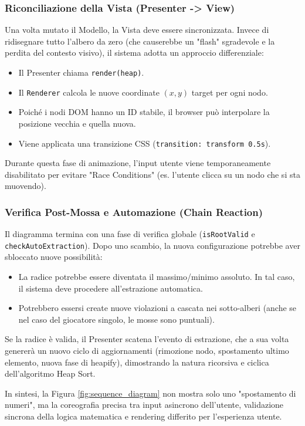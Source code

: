 \documentclass[openany]{theme/uniprthesis}
\begin{document}
\subsubsection{Riconciliazione della Vista (Presenter -> View)}
Una volta mutato il Modello, la Vista deve essere sincronizzata.
Invece di ridisegnare tutto l'albero da zero (che causerebbe un "flash" sgradevole e la perdita del contesto visivo), il sistema adotta un approccio differenziale:
\begin{itemize}
    \item Il Presenter chiama \texttt{render(heap)}.
    \item Il \texttt{Renderer} calcola le nuove coordinate $(x, y)$ target per ogni nodo.
    \item Poiché i nodi DOM hanno un ID stabile, il browser può interpolare la posizione vecchia e quella nuova.
    \item Viene applicata una transizione CSS (\texttt{transition: transform 0.5s}).
\end{itemize}
Durante questa fase di animazione, l'input utente viene temporaneamente disabilitato per evitare "Race Conditions" (es. l'utente clicca su un nodo che si sta muovendo).

\subsubsection{Verifica Post-Mossa e Automazione (Chain Reaction)}
Il diagramma termina con una fase di verifica globale (\texttt{isRootValid} e \texttt{checkAutoExtraction}).
Dopo uno scambio, la nuova configurazione potrebbe aver sbloccato nuove possibilità:
\begin{itemize}
    \item La radice potrebbe essere diventata il massimo/minimo assoluto. In tal caso, il sistema deve procedere all'estrazione automatica.
    \item Potrebbero essersi create nuove violazioni a cascata nei sotto-alberi (anche se nel caso del giocatore singolo, le mosse sono puntuali).
\end{itemize}
Se la radice è valida, il Presenter scatena l'evento di estrazione, che a sua volta genererà un nuovo ciclo di aggiornamenti (rimozione nodo, spostamento ultimo elemento, nuova fase di heapify), dimostrando la natura ricorsiva e ciclica dell'algoritmo Heap Sort.

In sintesi, la Figura \ref{fig:sequence_diagram} non mostra solo uno "spostamento di numeri", ma la coreografia precisa tra input asincrono dell'utente, validazione sincrona della logica matematica e rendering differito per l'esperienza utente.
\end{document}
